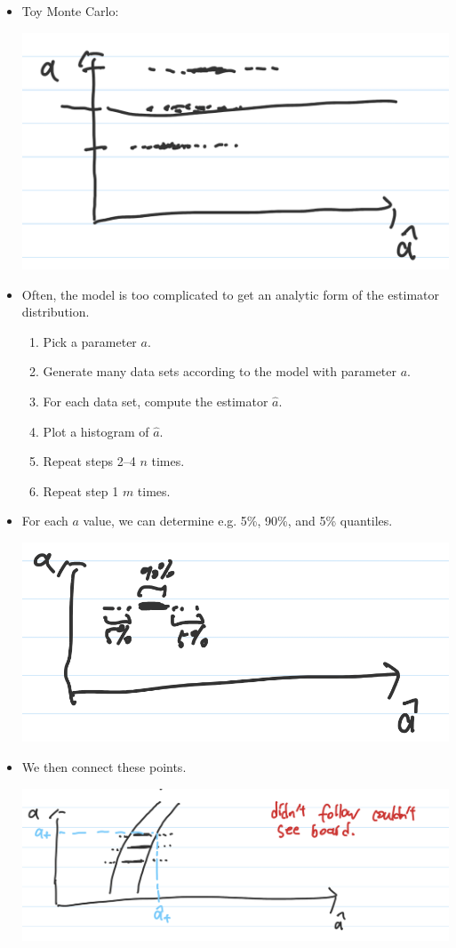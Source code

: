 \begin{itemize}
      \item Toy Monte Carlo:

            \includegraphics[width=0.6\linewidth]{Images/lec11-toy-monte-carlo.png}

      \item Often, the model is too complicated to get an analytic form of the estimator distribution.
            \begin{enumerate}
                  \item Pick a parameter $a$.
                  \item Generate many data sets according to the model with parameter $a$.
                  \item For each data set, compute the estimator $\hat{a}$.
                  \item Plot a histogram of $\hat{a}$.
                  \item Repeat steps 2–4 $n$ times.
                  \item Repeat step 1 $m$ times.
            \end{enumerate}
      \item For each $a$ value, we can determine e.g. 5\%, 90\%, and 5\% quantiles.

            \includegraphics[width=0.6\linewidth]{Images/lec11-mc-intervals.png}

      \item We then connect these points.

            \includegraphics[width=0.6\linewidth]{Images/lec11-fit-connect.png}


\end{itemize}
